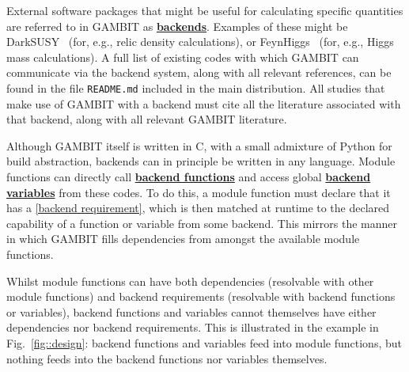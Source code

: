 \documentclass[pdftex,twocolumn,epjc3_preprint,runningheads]{svjour3}
\renewcommand{\_}{\discretionary{\underscore}{}{\underscore}}
\newcommand\term[1]{{\lstset{style=terminal}\lstinline!#1!\lstset{style=cpp}}}
\newcommand{\cross}[1]{\ref{#1}}
\newcommand{\doublecross}[2]{\hyperref[#2]{\textbf{#1}}}
\newcommand{\gambit}{\textsf{GAMBIT}\xspace}
\newcommand{\GB}{\gambit}
\newcommand\xx{\raisebox{0.2ex}{\smaller ++}\xspace}
\newcommand\Cpp{\textsf{C\xx}\xspace}
\newcommand\Python{\textsf{Python}\xspace}
\newcommand\python{\Python}
\begin{document}
External software packages that might be useful for calculating specific quantities are referred to in \GB as \doublecross{backends}{backend}.  Examples of these might be \textsf{DarkSUSY}~\cite{darksusy} (for, e.g., relic density calculations), or \textsf{FeynHiggs}~\cite{Heinemeyer:1998yj,Heinemeyer:1998np,Degrassi:2002fi,Frank:2006yh,Hahn:2013ria} (for, e.g., Higgs mass calculations).  A full list of existing codes with which \GB can communicate via the backend system, along with all relevant references, can be found in the file \term{README.md} included in the main distribution.  All studies that make use of \GB with a backend must cite all the literature associated with that backend, along with all relevant \GB literature.

Although \GB itself is written in \Cpp, with a small admixture of \python for build abstraction, backends can in principle be written in any language.  Module functions can directly call \doublecross{backend functions}{backend function} and access global \doublecross{backend variables}{backend variable} from these codes.  To do this, a module function must declare that it has a \cross{backend requirement}, which is then matched at runtime to the declared capability of a function or variable from some backend. This mirrors the manner in which \GB fills dependencies from amongst the available module functions.

Whilst module functions can have both dependencies (resolvable with other module functions) and backend requirements (resolvable with backend functions or variables), backend functions and variables cannot themselves have either dependencies nor backend requirements.  This is illustrated in the example in Fig.\ \ref{fig::design}: backend functions and variables feed into module functions, but nothing feeds into the backend functions nor variables themselves.
\end{document}

